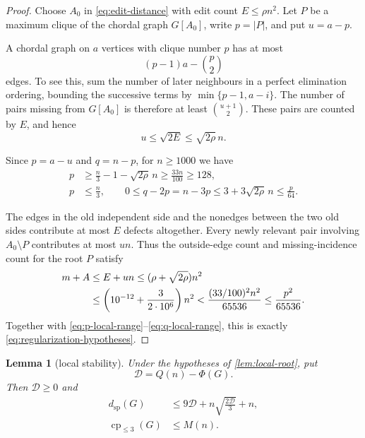 \documentclass[11pt,reqno]{amsart}
\numberwithin{equation}{section}
\newtheorem{lemma}[theorem]{Lemma}
\theoremstyle{definition}
\theoremstyle{remark}
\newcommand{\cple}[1]{\operatorname{cp}_{\leq #1}}
\newcommand{\PhiF}{\Phi}
\newcommand{\distsp}{d_{\mathrm{sp}}}
\begin{document}
\begin{proof}
Choose $A_0$ in \eqref{eq:edit-distance} with edit count
$E\leq\rho n^2$.  Let $P$ be a maximum clique of the chordal graph $G[A_0]$,
write $p=|P|$, and put $u=a-p$.

A chordal graph on $a$ vertices with clique number $p$ has at most
\begin{equation}\label{eq:chordal-edge-bound}
  (p-1)a-\binom p2
\end{equation}
edges.  To see this, sum the number of later neighbours in a perfect
elimination ordering, bounding the successive terms by
$\min\{p-1,a-i\}$.  The number of pairs missing from $G[A_0]$ is therefore at
least $\binom{u+1}{2}$.  These pairs are counted by $E$, and hence
\begin{equation}\label{eq:u-bound}
  u\leq\sqrt{2E}\leq\sqrt{2\rho}\,n.
\end{equation}

Since $p=a-u$ and $q=n-p$, for $n\geq1000$ we have
\begin{align}
  p&\geq \frac n3-1-\sqrt{2\rho}\,n
      \geq\frac{33n}{100}\geq128,\label{eq:p-local-range}\\
  p&\leq\frac n3,\qquad
  0\leq q-2p=n-3p
      \leq3+3\sqrt{2\rho}\,n\leq\frac p{64}.
  \label{eq:q-local-range}
\end{align}

The edges in the old independent side and the nonedges between the two old
sides contribute at most $E$ defects altogether.  Every newly relevant pair
involving $A_0\setminus P$ contributes at most $un$.  Thus the outside-edge
count and missing-incidence count for the root $P$ satisfy
\begin{align}
  m+A
  &\leq E+un
   \leq(\rho+\sqrt{2\rho})n^2 \notag\\
  &\leq\left(10^{-12}+\frac{3}{2\cdot10^6}\right)n^2
   <\frac{(33/100)^2n^2}{65536}
   \leq\frac{p^2}{65536}.
\end{align}
Together with \eqref{eq:p-local-range}--\eqref{eq:q-local-range}, this is
exactly \eqref{eq:regularization-hypotheses}.
\end{proof}

\begin{lemma}[local stability]\label{lem:local-stability}
Under the hypotheses of \cref{lem:local-root}, put
\[
  \mathcal{D}=Q(n)-\PhiF(G).
\]
Then $\mathcal{D}\geq0$ and
\begin{align}
  \distsp(G)
  &\leq9\mathcal{D}+n\sqrt{\frac{2\mathcal{D}}3}+n,
    \label{eq:local-stability}\\
  \cple{3}(G)&\leq M(n).
    \label{eq:local-integral-conclusion}
\end{align}
\end{lemma}
\end{document}
